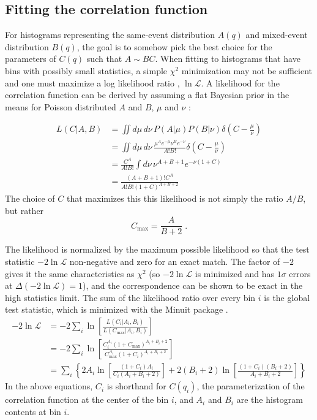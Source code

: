 
\subsection{Fitting the correlation function}

For histograms representing the same-event distribution $A(q)$ and mixed-event distribution $B(q)$, the goal is to somehow pick the best choice for the parameters of $C(q)$ such that $A \sim B C$.
When fitting to histograms that have bins with possibly small statistics, a simple $\chi^2$ minimization may not be sufficient and one must maximize a log likelihood ratio \cite{Baker:1983tu}, $\ln\mathcal{L}$.
A likelihood for the correlation function can be derived by assuming a flat Bayesian prior in the means for Poisson distributed $A$ and $B$, $\mu$ and $\nu$ \cite{Soltz:1994PhDT}:

\begin{align}
L(C|A,B) &= \iint d\mu \, d\nu \, P(A|\mu) P(B|\nu) \delta\left(C - \frac{\mu}{\nu} \right)\\
&= \iint d\mu \, d\nu \, \frac{\mu^{A} e^{-\mu} \nu^{B} e^{-\nu}}{A! B!} \delta\left(C - \frac{\mu}{\nu} \right)\\
&= \frac{C^A}{A! B!} \int d\nu \, \nu^{A+B+1} e^{-\nu (1+C)}\\
&= \frac{(A+B+1)! C^A}{A! B! (1+C)^{A+B+2}}
\end{align}
The choice of $C$ that maximizes this this likelihood is not simply the ratio $A/B$, but rather
\begin{equation} C_{\textrm{max}} = \frac{A}{B+2} \; .\end{equation}

The likelihood is normalized by the maximum possible likelihood so that the test statistic $-2\ln \mathcal{L}$ non-negative and zero for an exact match.
The factor of $-2$ gives it the same characteristics as $\chi^2$ (so $-2\ln\mathcal{L}$ is minimized and has $1\sigma$ errors at $\Delta (-2\ln\mathcal{L}) = 1$), and the correspondence can be shown to be exact in the high statistics limit.
The sum of the likelihood ratio over every bin $i$ is the global test statistic, which is minimized with the Minuit package \cite{James:1975dr}.
\begin{align}
-2\ln \mathcal{L} &= -2 \sum_i \ln \left[ \frac{L(C_i|A_i,B_i)}{L(C_{\textrm{max}}|A_i,B_i)} \right]\\
&= -2 \sum_i \ln \left[ \frac{C_i^{A_i} (1+C_{\textrm{max}})^{A_i+B_i+2}}{C_{\textrm{max}}^{A_i} (1+C_i)^{A_i+B_i+2}} \right]\\
&= \sum_i \left\{ 2 A_i \ln \left[\frac{(1+C_i)A_i}{C_i (A_i+B_i+2)} \right] + 2(B_i+2) \ln \left[ \frac{(1+C_i)(B_i+2)}{A_i+B_i+2} \right] \right\}
\end{align}
In the above equations, $C_i$ is shorthand for $C(q_i)$, the parameterization of the correlation function at the center of the bin $i$, and $A_i$ and $B_i$ are the histogram contents at bin $i$.

